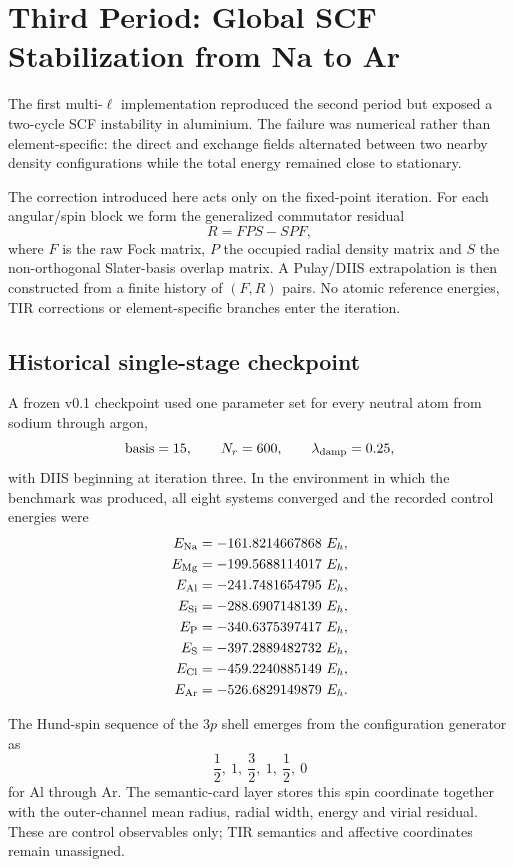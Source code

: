 \section{Third Period: Global SCF Stabilization from Na to Ar}
\label{sec:period3-global-diis}

The first multi-$\ell$ implementation reproduced the second period but exposed a two-cycle SCF instability in aluminium.  The failure was numerical rather than element-specific: the direct and exchange fields alternated between two nearby density configurations while the total energy remained close to stationary.

The correction introduced here acts only on the fixed-point iteration.  For each angular/spin block we form the generalized commutator residual
\[
R = F P S - S P F,
\]
where $F$ is the raw Fock matrix, $P$ the occupied radial density matrix and $S$ the non-orthogonal Slater-basis overlap matrix.  A Pulay/DIIS extrapolation is then constructed from a finite history of $(F,R)$ pairs.  No atomic reference energies, TIR corrections or element-specific branches enter the iteration.

\subsection{Historical single-stage checkpoint}
A frozen v0.1 checkpoint used one parameter set for every neutral atom from sodium through argon,
\[
\text{basis}=15,\qquad N_r=600,\qquad \lambda_{\rm damp}=0.25,
\]
with DIIS beginning at iteration three.  In the environment in which the benchmark was produced, all eight systems converged and the recorded control energies were
\begin{align*}
E_{\rm Na}&=-161.8214667868\ E_h,\\
E_{\rm Mg}&=-199.5688114017\ E_h,\\
E_{\rm Al}&=-241.7481654795\ E_h,\\
E_{\rm Si}&=-288.6907148139\ E_h,\\
E_{\rm P} &=-340.6375397417\ E_h,\\
E_{\rm S} &=-397.2889482732\ E_h,\\
E_{\rm Cl}&=-459.2240885149\ E_h,\\
E_{\rm Ar}&=-526.6829149879\ E_h.
\end{align*}

The Hund-spin sequence of the $3p$ shell emerges from the configuration generator as
\[
\frac12,\ 1,\ \frac32,\ 1,\ \frac12,\ 0
\]
for Al through Ar.  The semantic-card layer stores this spin coordinate together with the outer-channel mean radius, radial width, energy and virial residual.  These are control observables only; TIR semantics and affective coordinates remain unassigned.

